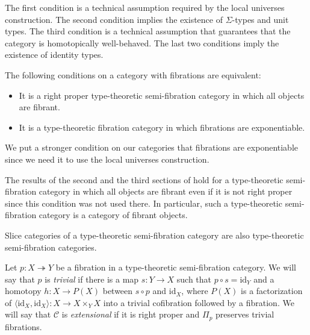 \documentclass[reqno]{amsart}
\theoremstyle{definition}
\theoremstyle{remark}
\newcommand{\fs}[1]{\mathrm{#1}}
\newcommand{\scat}[1]{\mathcal{#1}}
\newcommand{\id}{\fs{id}}
\numberwithin{figure}{section}
\begin{document}
The first condition is a technical assumption required by the local universes construction.
The second condition implies the existence of $\Sigma$-types and unit types.
The third condition is a technical assumption that guarantees that the category is homotopically well-behaved.
The last two conditions imply the existence of identity types.

The following conditions on a category with fibrations are equivalent:
\begin{itemize}
\item It is a right proper type-theoretic semi-fibration category in which all objects are fibrant.
\item It is a type-theoretic fibration category in which fibrations are exponentiable.
\end{itemize}
We put a stronger condition on our categories that fibrations are exponentiable since we need it to use the local universes construction.

\begin{remark}
The results of the second and the third sections of \cite{shul-inv} hold for a type-theoretic semi-fibration category in which all objects are fibrant even if it is not right proper since this condition was not used there.
In particular, such a type-theoretic semi-fibration category is a category of fibrant objects.
\end{remark}

\begin{remark}
Slice categories of a type-theoretic semi-fibration category are also type-theoretic semi-fibration categories.
\end{remark}

Let $p : X \twoheadrightarrow Y$ be a fibration in a type-theoretic semi-fibration category.
We will say that $p$ is \emph{trivial} if there is a map $s : Y \to X$ such that $p \circ s = \id_Y$ and a homotopy $h : X \to P(X)$ between $s \circ p$ and $\id_X$,
where $P(X)$ is a factorization of $\langle \id_X, \id_X \rangle : X \to X \times_Y X$ into a trivial cofibration followed by a fibration.
We will say that $\scat{C}$ is \emph{extensional} if it is right proper and $\Pi_p$ preserves trivial fibrations.
\end{document}
